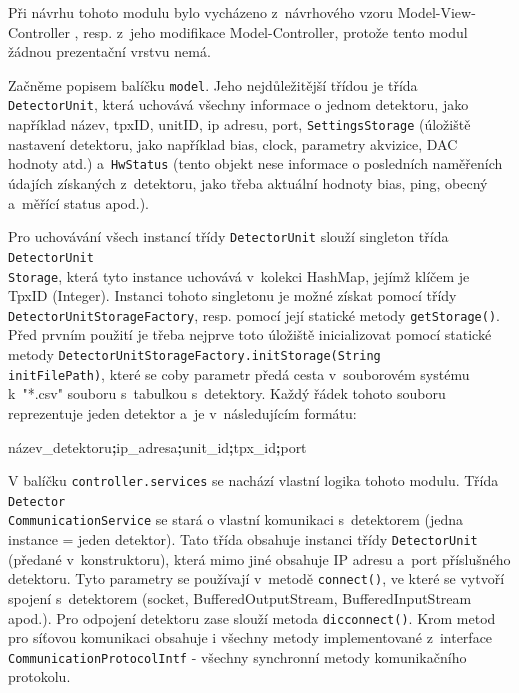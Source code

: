 Při návrhu tohoto modulu bylo vycházeno z~návrhového vzoru Model-View-Controller \cite{DesignPatterns-Gamma:1995:DPE:186897}, resp. z~jeho modifikace Model-Controller, protože tento modul žádnou prezentační vrstvu nemá. 

Začněme popisem balíčku \texttt{model}. Jeho nejdůležitější třídou je třída \texttt{DetectorUnit}, která uchovává všechny informace o jednom detektoru, jako například název, tpxID, unitID, ip adresu, port, \texttt{SettingsStorage} (úložiště nastavení detektoru, jako například bias, clock, parametry akvizice, DAC hodnoty atd.) a~\texttt{HwStatus} (tento objekt nese informace o posledních naměřeních údajích získaných z~detektoru, jako třeba aktuální hodnoty bias, ping, obecný a~měřící status apod.).

Pro uchovávání všech instancí třídy \texttt{DetectorUnit} slouží singleton \cite{DesignPatterns-Gamma:1995:DPE:186897} třída \texttt{DetectorUnit\\Storage}, která tyto instance uchovává v~kolekci HashMap, jejímž klíčem je TpxID (Integer). Instanci tohoto singletonu je možné získat pomocí třídy \texttt{DetectorUnitStorageFactory}, resp. pomocí její statické metody \texttt{getStorage()}. Před prvním použití je třeba nejprve toto úložiště inicializovat pomocí statické metody \texttt{DetectorUnitStorageFactory.initStorage(String\\initFilePath)}, které se coby parametr předá cesta v~souborovém systému k~"*.csv" souboru s~tabulkou s~detektory. Každý řádek tohoto souboru reprezentuje jeden detektor a~je v~následujícím formátu:
\begin{center}
	název\_detektoru\textbf{\Large{;}}ip\_adresa\textbf{\Large{;}}unit\_id\textbf{\Large{;}}tpx\_id\textbf{\Large{;}}port
\end{center}

V balíčku \texttt{controller.services} se nachází vlastní logika tohoto modulu. 
Třída \texttt{Detector\\CommunicationService} se stará o vlastní komunikaci s~detektorem (jedna instance = jeden detektor). Tato třída obsahuje instanci třídy \texttt{DetectorUnit} (předané v~konstruktoru), která mimo jiné obsahuje IP adresu a~port příslušného detektoru. Tyto parametry se používají v~metodě \texttt{connect()}, ve které se vytvoří spojení s~detektorem (socket, BufferedOutputStream, BufferedInputStream apod.). Pro odpojení detektoru zase slouží metoda \texttt{dicconnect()}. Krom metod pro síťovou komunikaci obsahuje i všechny metody implementované z~interface \texttt{CommunicationProtocolIntf} - všechny synchronní metody komunikačního protokolu. 

